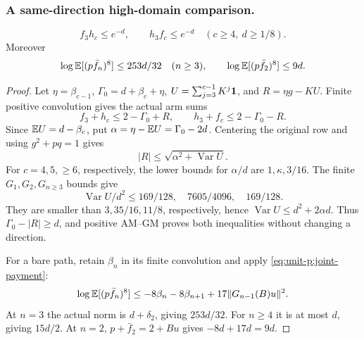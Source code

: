 \subsubsection{A same-direction high-domain comparison.}
\begin{lemma}\label{lem:unit-p:three-centered}
\begin{equation}\label{eq:R37:centered-pair}
 f_3h_c\le e^{-d},\qquad h_3f_c\le e^{-d}
 \quad(c\ge4,\ d\ge1/8).
\end{equation}
Moreover
\[
 \log\mathbb E[(p\bar f_n)^8]\le253d/32\quad(n\ge3),
 \qquad \log\mathbb E[(p\bar f_2)^8]\le9d .
\]
\end{lemma}
\begin{proof}
Let \(\eta=\beta_{c-1}\), \(\Gamma_0=d+\beta_c+\eta\),
\(U=\sum_{j=3}^{c-1}K^j\mathbf1\), and \(R=\eta g-KU\).
Finite positive convolution gives the actual arm sums
\[
 f_3+h_c\le2-\Gamma_0+R,\qquad
 h_3+f_c\le2-\Gamma_0-R .
\]
Since \(\mathbb E U=d-\beta_c\), put
\(\alpha=\eta-\mathbb E U=\Gamma_0-2d\).
Centering the original row and using \(g^2+pq=1\) gives
\[
 |R|\le\sqrt{\alpha^2+\operatorname{Var}U}.
\]
For \(c=4,5,\ge6\), respectively, the lower bounds for \(\alpha/d\)
are \(1,\kappa,3/16\). The finite \(G_1,G_2,G_{n\ge3}\) bounds give
\[
 \operatorname{Var}U/d^2\le
 169/128,\quad7605/4096,\quad169/128 .
\]
They are smaller than \(3,35/16,11/8\), respectively, hence
\(\operatorname{Var}U\le d^2+2\alpha d\).
Thus \(\Gamma_0-|R|\ge d\), and positive AM--GM proves both
inequalities without changing a direction.

For a bare path, retain \(\beta_n\) in its finite convolution and
apply \eqref{eq:unit-p:joint-payment}:
\[
 \log\mathbb E[(p\bar f_n)^8]
 \le-8\beta_n-8\beta_{n+1}+17\|G_{n-1}(B)u\|^2.
\]
At \(n=3\) the actual norm is \(d+\delta_2\), giving \(253d/32\).
For \(n\ge4\) it is at most \(d\), giving \(15d/2\).
At \(n=2\), \(p+\bar f_2=2+Bu\) gives \(-8d+17d=9d\).
\end{proof}

